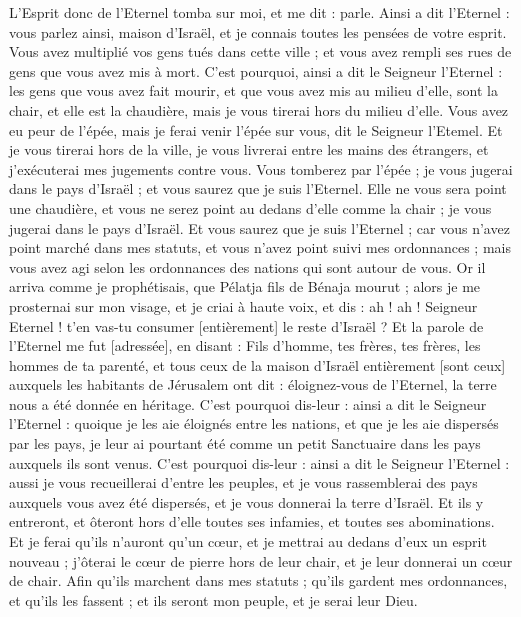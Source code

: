\begin{multicols}{2}
L'Esprit donc de l'Eternel tomba sur moi, et me dit : parle. Ainsi a dit l'Eternel : vous parlez ainsi, maison d'Israël, et je connais toutes les pensées de votre esprit.
Vous avez multiplié vos gens tués dans cette ville ; et vous avez rempli ses rues de gens que vous avez mis à mort.
C'est pourquoi, ainsi a dit le Seigneur l'Eternel : les gens que vous avez fait mourir, et que vous avez mis au milieu d'elle, sont la chair, et elle est la chaudière, mais je vous tirerai hors du milieu d'elle.
Vous avez eu peur de l'épée, mais je ferai venir l'épée sur vous, dit le Seigneur l'Etemel.
Et je vous tirerai hors de la ville, je vous livrerai entre les mains des étrangers, et j'exécuterai mes jugements contre vous.
Vous tomberez par l'épée ; je vous jugerai dans le pays d'Israël ; et vous saurez que je suis l'Eternel.
Elle ne vous sera point une chaudière, et vous ne serez point au dedans d'elle comme la chair ; je vous jugerai dans le pays d'Israël.
Et vous saurez que je suis l'Eternel ; car vous n'avez point marché dans mes statuts, et vous n'avez point suivi mes ordonnances ; mais vous avez agi selon les ordonnances des nations qui sont autour de vous.
Or il arriva comme je prophétisais, que Pélatja fils de Bénaja mourut ; alors je me prosternai sur mon visage, et je criai à haute voix, et dis : ah ! ah ! Seigneur Eternel ! t'en vas-tu consumer [entièrement] le reste d'Israël ?
Et la parole de l'Eternel me fut [adressée], en disant :
Fils d'homme, tes frères, tes frères, les hommes de ta parenté, et tous ceux de la maison d'Israël entièrement [sont ceux] auxquels les habitants de Jérusalem ont dit : éloignez-vous de l'Eternel, la terre nous a été donnée en héritage.
C'est pourquoi dis-leur : ainsi a dit le Seigneur l'Eternel : quoique je les aie éloignés entre les nations, et que je les aie dispersés par les pays, je leur ai pourtant été comme un petit Sanctuaire dans les pays auxquels ils sont venus.
C'est pourquoi dis-leur : ainsi a dit le Seigneur l'Eternel : aussi je vous recueillerai d'entre les peuples, et je vous rassemblerai des pays auxquels vous avez été dispersés, et je vous donnerai la terre d'Israël.
Et ils y entreront, et ôteront hors d'elle toutes ses infamies, et toutes ses abominations.
Et je ferai qu'ils n'auront qu'un cœur, et je mettrai au dedans d'eux un esprit nouveau ; j'ôterai le cœur de pierre hors de leur chair, et je leur donnerai un cœur de chair.
Afin qu'ils marchent dans mes statuts ; qu'ils gardent mes ordonnances, et qu'ils les fassent ; et ils seront mon peuple, et je serai leur Dieu.

\end{multicols}

